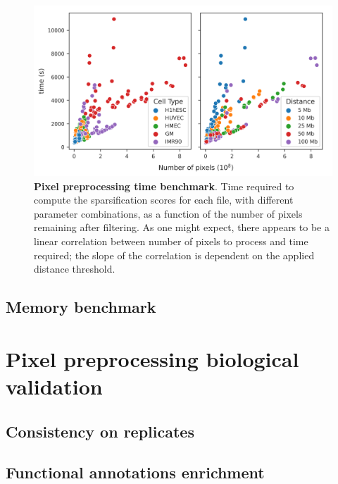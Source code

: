 \begin{figure}[ht]
  \centering
  \includegraphics[width=1\textwidth]{time_benchmark.png}
  \caption{\textbf{Pixel preprocessing time benchmark}. Time required to compute the sparsification scores for each file, with different parameter combinations, as a function of the number of pixels remaining after filtering. As one might expect, there appears to be a linear correlation between number of pixels to process and time required; the slope of the correlation is dependent on the applied distance threshold.}
  \label{fig:timebenchmark}
\end{figure}

\subsection{Memory benchmark}

\section{Pixel preprocessing biological validation}

\subsection{Consistency on replicates}

\subsection{Functional annotations enrichment}




